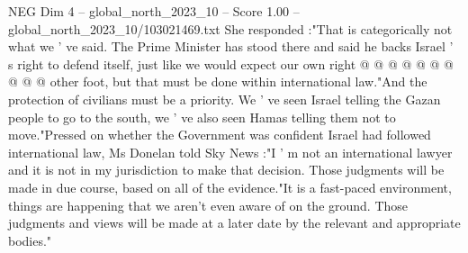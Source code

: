 \begin{textsample}{NEG Dim 4 – global\_north\_2023\_10 – Score 1.00 – global\_north\_2023\_10/103021469.txt}
She responded :"That is categorically not what we ' ve said.
The Prime Minister has stood there and said he backs Israel ' s right to defend itself, just like we would expect our own right @ @ @ @ @ @ @ @ @ @ other foot, but that must be done within international law."And the protection of civilians must be a priority.
We ' ve seen Israel telling the Gazan people to go to the south, we ' ve also seen Hamas telling them not to move."Pressed on whether the Government was confident Israel had followed international law, Ms Donelan told Sky News :"I ' m not an international lawyer and it is not in my jurisdiction to make that decision.
Those judgments will be made in due course, based on all of the evidence."It is a fast-paced environment, things are happening that we aren't even aware of on the ground.
Those judgments and views will be made at a later date by the relevant and appropriate bodies."

\end{textsample}

